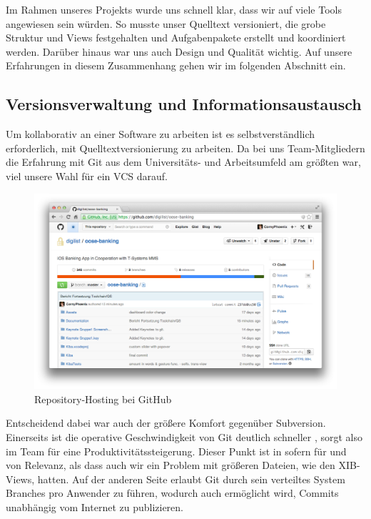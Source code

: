 Im Rahmen unseres Projekts wurde uns schnell klar, dass wir auf viele Tools angewiesen sein würden. So musste unser Quelltext versioniert, die grobe Struktur und Views festgehalten und Aufgabenpakete erstellt und koordiniert werden. Darüber hinaus war uns auch Design und Qualität wichtig. Auf unsere Erfahrungen in diesem Zusammenhang gehen wir im folgenden Abschnitt ein.

\subsection{Versionsverwaltung und Informationsaustausch}
	Um kollaborativ an einer Software zu arbeiten ist es selbstverständlich erforderlich, mit Quelltextversionierung zu arbeiten. Da bei uns Team-Mitgliedern die Erfahrung mit Git \citep{Git14} aus dem Universitäts- und Arbeitsumfeld am größten war, viel unsere Wahl für ein \acs{VCS} darauf.
	
\begin{figure}[h!]
	\centering
	\includegraphics[scale=.25]{Pictures/GitHubOverview}
	\caption{Repository-Hosting bei GitHub \label{fig:GitHubOverview}}
\end{figure}
	
	Entscheidend dabei war auch der größere Komfort gegenüber Subversion. Einerseits ist die operative Geschwindigkeit von Git deutlich schneller \citep{TimeDoctor11}, sorgt also im Team für eine Produktivitätssteigerung. Dieser Punkt ist in sofern für und von Relevanz, als dass auch wir ein Problem mit größeren Dateien, wie den XIB-Views, hatten. Auf der anderen Seite erlaubt Git durch sein verteiltes System Branches pro Anwender zu führen, wodurch auch ermöglicht wird, Commits  unabhängig vom Internet zu publizieren. 
	
